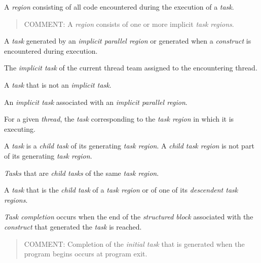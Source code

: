 \glossarydefstart
A \emph{region} consisting of all code encountered during the execution 
of a \emph{task}.

\begin{quote}
COMMENT: A  \emph{region} consists of one or more implicit 
\emph{task regions}.
\end{quote}
\glossarydefend

\glossarydefstart
A \emph{task} generated by an \emph{implicit parallel region} or generated 
when a  \emph{construct} is encountered during execution.
\glossarydefend

\glossarydefstart
The \emph{implicit task} of the current thread team assigned to the 
encountering thread.
\glossarydefend

\glossarydefstart
A \emph{task} that is not an \emph{implicit task}.
\glossarydefend

\glossarydefstart
An \emph{implicit task} associated with an \emph{implicit parallel region}.
\glossarydefend

\glossarydefstart
For a given \emph{thread}, the \emph{task} corresponding to the 
\emph{task region} in which it is executing.
\glossarydefend

\glossarydefstart
A \emph{task} is a \emph{child task} of its generating \emph{task region}.
A \emph{child task region} is not part of its generating \emph{task region}.
\glossarydefend

\glossarydefstart
\emph{Tasks} that are \emph{child tasks} of the same \emph{task region}.
\glossarydefend

\glossarydefstart
A \emph{task} that is the \emph{child task} of a \emph{task region} or 
of one of its \emph{descendent task regions}.
\glossarydefend

\glossarydefstart
\emph{Task completion} occurs when the end of the \emph{structured block} 
associated with the \emph{construct} that generated the \emph{task} is reached.

\begin{quote}
COMMENT: Completion of the \emph{initial task} that is generated when the 
program begins occurs at program exit.
\end{quote}
\glossarydefend

